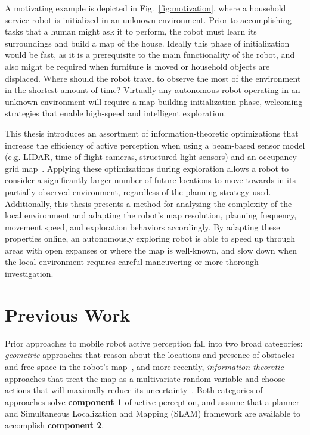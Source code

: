 A motivating example is depicted in Fig.~\ref{fig:motivation}, where a household
service robot is initialized in an unknown environment. Prior to accomplishing
tasks that a human might ask it to perform, the robot must learn its
surroundings and build a map of the house. Ideally this phase of
initialization would be fast, as it is a prerequisite to the main functionality
of the robot, and also might be required when furniture is moved or
household objects are displaced. Where should the robot travel to observe the
most of the environment in the shortest amount of time? Virtually any autonomous robot
operating in an unknown environment will require a map-building
initialization phase, welcoming strategies that enable high-speed and intelligent
exploration.

This thesis introduces an assortment of information-theoretic optimizations that
increase the efficiency of active perception when using a beam-based sensor
model (e.g. LIDAR, time-of-flight cameras, structured light sensors) and
an occupancy grid map~\cite{elfes1989using}. Applying these optimizations during exploration allows a
robot to consider a significantly larger number of future locations to move
towards in its partially observed environment, regardless of the planning
strategy used. Additionally, this thesis presents a method for analyzing the
complexity of the local environment and adapting the robot's map resolution,
planning frequency, movement speed, and exploration behaviors accordingly. By
adapting these properties online, an autonomously exploring robot is able to speed up
through areas with open expanses or where the map is well-known, and slow down
when the local environment requires careful maneuvering or more thorough
investigation.

\section{Previous Work}

Prior approaches to mobile robot active perception fall into two
broad categories: \textit{geometric} approaches that reason about the locations and
presence of obstacles and free space in the robot's
map~\cite{acar2002sensor,chan1993line,wang2007view,
burgard2000collaborative,taylor1993exploration,yamauchi1997frontier}, and more
recently, \textit{information-theoretic} approaches that treat the map as
a multivariate random variable and choose actions that will maximally reduce its
uncertainty~\cite{amigoni2010information,bourgault2002information,charrow2015icra,
julian2013mutual,feder1999adaptive}. Both categories of approaches solve {\bf
component 1} of active perception, and assume that a planner and Simultaneous
Localization and Mapping (SLAM) framework are available to accomplish {\bf
component 2}.

